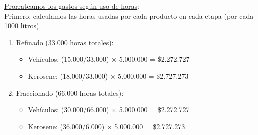 \documentclass[10pt,a4paper]{article}
\begin{document}
\begin{enumerate}[label=\textbf{\sffamily\large\arabic*.}]
\begin{itemize}
    \end{itemize}

    \underline{Prorrateamos los gastos según uso de horas}: \\

    Primero, calculamos las horas usadas por cada producto en cada etapa (por cada 1000 litros)

    \begin{center}
    \end{center}

    \clearpage

    \begin{enumerate}[label=\alph*)]

        \item Refinado (33.000 horas totales):
        
        \begin{itemize}

            \item Vehículos: (15.000/33.000) × 5.000.000 = \$2.272.727
            \item Kerosene: (18.000/33.000) × 5.000.000 = \$2.727.273 \\
    
        \end{itemize}

        \item Fraccionado (66.000 horas totales):
        
        \begin{itemize}

            \item Vehículos: (30.000/66.000) × 5.000.000 = \$2.272.727
            \item Kerosene: (36.000/6.000) × 5.000.000 = \$2.727.273 \\
    

\end{itemize}
\end{enumerate}
\end{enumerate}
\end{document}
